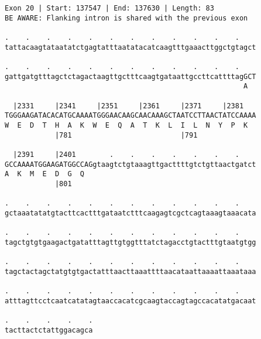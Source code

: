 \documentclass{article}
\begin{document}
\begin{Verbatim}
Exon 20 | Start: 137547 | End: 137630 | Length: 83
BE AWARE: Flanking intron is shared with the previous exon
 
.    .    .    .    .    .    .    .    .    .    .    .    
tattacaagtataatatctgagtatttaatatacatcaagtttgaaacttggctgtagct
  
.    .    .    .    .    .    .    .    .    .    .    .    
gattgatgtttagctctagactaagttgctttcaagtgataattgccttcattttagGCT
                                                         A  
  
  |2331     |2341     |2351     |2361     |2371     |2381   
TGGGAAGATACACATGCAAAATGGGAACAAGCAACAAAGCTAATCCTTAACTATCCAAAA
W  E  D  T  H  A  K  W  E  Q  A  T  K  L  I  L  N  Y  P  K  
            |781                          |791              
  
  |2391     |2401        .    .    .    .    .    .    .    
GCCAAAATGGAAGATGGCCAGgtaagtctgtaaagttgacttttgtctgttaactgatct
A  K  M  E  D  G  Q                                         
            |801                                            
  
.    .    .    .    .    .    .    .    .    .    .    .    
gctaaatatatgtacttcactttgataatctttcaagagtcgctcagtaaagtaaacata
  
.    .    .    .    .    .    .    .    .    .    .    .    
tagctgtgtgaagactgatatttagttgtggtttatctagacctgtactttgtaatgtgg
  
.    .    .    .    .    .    .    .    .    .    .    .    
tagctactagctatgtgtgactatttaacttaaattttaacataattaaaattaaataaa
  
.    .    .    .    .    .    .    .    .    .    .    .    
atttagttcctcaatcatatagtaaccacatcgcaagtaccagtagccacatatgacaat
  
.    .    .    .    .
tacttactctattggacagca
\end{Verbatim}
\newpage
\end{document}
